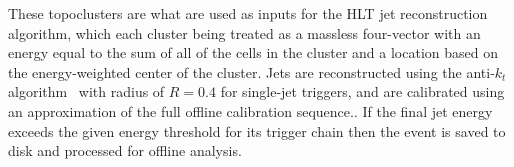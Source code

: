 These topoclusters are what are used as inputs for the HLT jet reconstruction algorithm, which each cluster being treated as a massless four-vector with an energy equal to the sum of all of the cells in the cluster and a location based on the energy-weighted center of the cluster.  Jets are reconstructed using the anti-$k_t$ algorithm~\cite{AntiKt} with radius of $R = 0.4$ for single-jet triggers, and are calibrated using an approximation of the full offline calibration sequence.\cite{L1Calo_Run2}.  If the final jet energy exceeds the given energy threshold for its trigger chain then the event is saved to disk and processed for offline analysis.